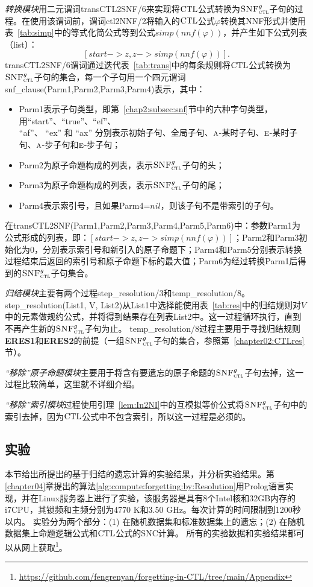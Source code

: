 {\em 转换模块}用二元谓词transCTL2SNF/6来实现将$\textrm{CTL}$公式转换为${\textsc{SNF}_{\textsc{ctl}}^g}$子句的过程。在使用该谓词前，谓词ctl2NNF/2将输入的$\textrm{CTL}$公式$\varphi$转换其NNF形式并使用表~\ref{tab:simp}中的等式化简公式等到公式$simp(nnf(\varphi))$，并产生如下公式列表（list）：
$$[start-> z, z -> simp(nnf(\varphi))].$$
transCTL2SNF/6谓词通过迭代表~\ref{tab:trans}中的每条规则将$\textrm{CTL}$公式转换为${\textsc{SNF}_{\textsc{ctl}}^g}$子句的集合，每一个子句用一个四元谓词snf\_clause(Parm1,Parm2,Parm3,Parm4)表示，其中：
\begin{itemize}
	\item Parm1表示子句类型，即第~\ref{chap2:subsec:snf}节中的六种字句类型，用“start”、“true”、“ef”、\\“af”、 “ex” 和 “ax” 分别表示初始子句、全局子句、$\textsc{a}$-某时子句、$\textsc{e}$-某时子句、$\textsc{a}$-步子句和$\textsc{e}$-步子句；
	\item Parm2为原子命题构成的列表，表示${\textsc{SNF}_{\textsc{ctl}}^g}$子句的头；
	\item Parm3为原子命题构成的列表，表示${\textsc{SNF}_{\textsc{ctl}}^g}$子句的尾；
	\item Parm4表示索引号，且如果Parm4=$nil$，则该子句不是带索引的子句。
\end{itemize}

在transCTL2SNF(Parm1,Parm2,Parm3,Parm4,Parm5,Parm6)中：参数Parm1为公式形成的列表，即：$[start-> z, z -> simp(nnf(\varphi))]$；Parm2和Parm3初始化为0，分别表示索引号和新引入的原子命题下；Parm4和Parm5分别表示转换过程结束后返回的索引号和原子命题下标的最大值；Parm6为经过转换Parm1后得到的${\textsc{SNF}_{\textsc{ctl}}^g}$子句集合。


{\em 归结模块}主要有两个过程step\_resolution/3和temp\_resolution/8。step\_resolution(List1, V, List2)从List1中选择能使用表~\ref{tab:res}中的归结规则对$V$中的元素做规约公式，并将得到结果存在列表List2中。这一过程循环执行，直到不再产生新的${\textsc{SNF}_{\textsc{ctl}}^g}$子句为止。
temp\_resolution/8过程主要用于寻找归结规则\textbf{ERES1}和\textbf{ERES2}的前提（一组${\textsc{SNF}_{\textsc{ctl}}^g}$子句的集合，参照第~\ref{chapter02:CTLres}节）。

{\em “移除”原子命题模块}主要用于将含有要遗忘的原子命题的${\textsc{SNF}_{\textsc{ctl}}^g}$子句去掉，这一过程比较简单，这里就不详细介绍。

{\em “移除”索引模块}过程使用引理~\ref{lem:In2NI}中的互模拟等价公式将${\textsc{SNF}_{\textsc{ctl}}^g}$子句中的索引去掉，因为$\textrm{CTL}$公式中不包含索引，所以这一过程是必须的。


\subsection{实验}\label{cha5:subsec:expriment}
 本节给出所提出的基于归结的遗忘计算的实验结果，并分析实验结果。第\ref{chapter04}章提出的算法\ref{alg:compute:forgetting:by:Resolution}用Prolog语言实现，并在Linux服务器上进行了实验，该服务器是具有8个Intel核和32GB内存的i7CPU，其锁频和主频分别为4770 K和3.50 GHz。每次计算的时间限制到1200秒以内。
	实验分为两个部分：(1) 在随机数据集和标准数据集上的遗忘；(2) 在随机数据集上命题逻辑公式和$\textrm{CTL}$公式的SNC计算。
	所有的实验数据和实验结果都可以从网上获取\footnote{ \url{https://github.com/fengrenyan/forgetting-in-CTL/tree/main/Appendix}}。
	
